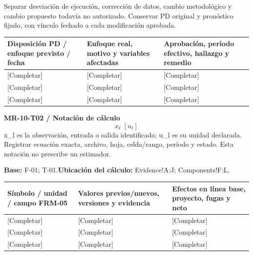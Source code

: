 Separar desviación de ejecución, corrección de datos, cambio metodológico y cambio propuesto todavía no autorizado. Conservar PD original y pronóstico fijado, con vínculo fechado a cada modificación aprobada.\par
{}
{\sffamily\fontsize{8.6}{10.7}\selectfont\begin{longtable}{@{}P{48mm}P{61mm}P{53mm}@{}}
\toprule
\textbf{Disposición PD / enfoque previsto / fecha} & \textbf{Enfoque real, motivo y variables afectadas} & \textbf{Aprobación, período efectivo, hallazgo y remedio}\\\midrule\endhead
\rule{0pt}{8mm}[Completar] & [Completar] & [Completar]\\\hline
\rule{0pt}{8mm}[Completar] & [Completar] & [Completar]\\\hline
\rule{0pt}{8mm}[Completar] & [Completar] & [Completar]\\\hline
\end{longtable}}
\par\begingroup\sffamily\fontsize{8.4}{10.5}\selectfont\color{NEBGreen}
\textbf{MR-10-T02 / Notación de cálculo}\
{\fontsize{10}{12}\selectfont\[x_{\ell}\;[u_{\ell}]\]}
x\_l es la observación, entrada o salida identificada; u\_l es su unidad declarada. Registrar ecuación exacta, archivo, hoja, celda/rango, período y estado. Esta notación no prescribe un estimador.\par
\textbf{Base:} F-01; T-01.\quad\textbf{Ubicación del cálculo:} Evidence!A:J; Components!F:L.\par\endgroup
{\sffamily\fontsize{8.6}{10.7}\selectfont\begin{longtable}{@{}P{48mm}P{61mm}P{53mm}@{}}
\toprule
\textbf{Símbolo / unidad / campo FRM-05} & \textbf{Valores previos/nuevos, versiones y evidencia} & \textbf{Efectos en línea base, proyecto, fugas y neto}\\\midrule\endhead
\rule{0pt}{8mm}[Completar] & [Completar] & [Completar]\\\hline
\rule{0pt}{8mm}[Completar] & [Completar] & [Completar]\\\hline
\rule{0pt}{8mm}[Completar] & [Completar] & [Completar]\\\hline
\end{longtable}}

